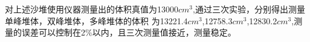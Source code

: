 对上述沙堆使用仪器测量出的体积真值为13000$cm^3$,通过三次实验，分别得出测量单峰堆体，双峰堆体，多峰堆体的体积
为13221.4$cm^3$,12758.3$cm^3$,12830.2$cm^3$,测量的误差可以控制在2$\%$以内，且三次测量值接近，测量稳定。
